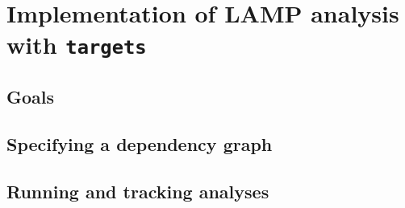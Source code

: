 \documentclass[../thesis.tex]{subfiles}
\begin{document}
\section{Implementation of LAMP analysis with \texttt{targets}}

\subsection{Goals}

\subsection{Specifying a dependency graph}

\subsection{Running and tracking analyses}


\dobib %
 
\end{document}

